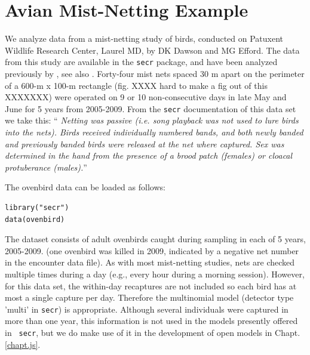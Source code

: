 \section{Avian Mist-Netting Example}

We analyze data from a mist-netting study of birds, conducted on
Patuxent Wildlife Research Center, Laurel MD, by DK Dawson and MG
Efford. The data from this study are available in the \mbox{\tt secr}
package, and have been analyzed previously by
\citet{efford_etal:2004}, see also \citet{borchers_efford:2008}.
Forty-four mist nets spaced 30 m apart on the perimeter of a 600-m x
100-m rectangle (fig. XXXX hard to make a fig out of this XXXXXXX) were operated on 9 or 10 non-consecutive
days in late May and June for 5 years from 2005-2009.  From the
\mbox{\tt secr} documentation of this data set we take this: ``{\it
  Netting was passive (i.e. song playback was not used to lure birds
  into the nets). Birds received individually numbered bands, and both
  newly banded and previously banded birds were released at the net
  where captured. Sex was determined in the hand from the presence of
  a brood patch (females) or cloacal protuberance (males).}''  

The ovenbird 
data can be loaded as follows:
\begin{verbatim}
library("secr")
data(ovenbird)
\end{verbatim}
The dataset consists of adult ovenbirds caught during sampling in each
of 5 years, 2005-2009. (one ovenbird was killed in 2009, indicated by
a negative net number in the encounter data file).
As with most mist-netting studies, nets are checked multiple times
during a day (e.g., every hour during a morning session). However, for
this data set, the within-day recaptures are not included so each bird
has at most a single capture per day. Therefore the multinomial model
(detector type 'multi' in \mbox{\tt secr}) is appropriate. 
 Although
several individuals were captured in more than one year, this
information is not used in the models presently offered in \mbox{\tt
  secr}, but we do make use of it in the development of open models in
Chapt. \ref{chapt.js}.
%


